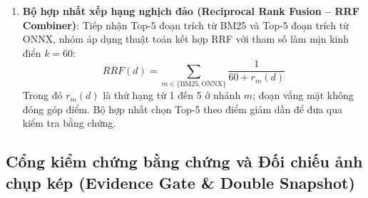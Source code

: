 \begin{enumerate}[nosep]
\begin{itemize}[nosep]
\begin{equation}
    \end{equation}
    \item Tính toán độ tương đồng Cosine thông qua tích vô hướng vector giữa câu truy vấn và các đoạn trích trong kho, trả về Top-5 đoạn trích có độ tương đồng ngữ nghĩa cao nhất.
  \end{itemize}
  \item \textbf{Bộ hợp nhất xếp hạng nghịch đảo (Reciprocal Rank Fusion -- RRF Combiner)}:
  Tiếp nhận Top-5 đoạn trích từ BM25 và Top-5 đoạn trích từ ONNX, nhóm áp dụng thuật toán kết hợp RRF với tham số làm mịn kinh điển $k = 60$:
  \begin{equation}
  \label{eq:rrf_score}
  RRF(d) = \sum_{m \in \{\text{BM25}, \text{ONNX}\}} \frac{1}{60 + r_m(d)}
  \end{equation}
  Trong đó $r_m(d)$ là thứ hạng từ 1 đến 5 ở nhánh $m$; đoạn vắng mặt không đóng góp điểm. Bộ hợp nhất chọn Top-5 theo điểm giảm dần để đưa qua kiểm tra bằng chứng.
\end{enumerate}

\subsection{Cổng kiểm chứng bằng chứng và Đối chiếu ảnh chụp kép (Evidence Gate \& Double Snapshot)}

